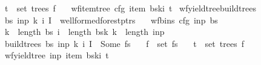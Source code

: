 \begin{isabellebody}
\ \ \ {\isachardoublequoteopen}t\ {\isasymin}\ set\ {\isacharparenleft}{\kern0pt}trees\ f{\isacharparenright}{\kern0pt}{\isachardoublequoteclose}\isanewline
\ \ \ {\isachardoublequoteopen}wf{\isacharunderscore}{\kern0pt}item{\isacharunderscore}{\kern0pt}tree\ cfg\ {\isacharparenleft}{\kern0pt}item\ {\isacharparenleft}{\kern0pt}bs{\isacharbang}{\kern0pt}k{\isacharbang}{\kern0pt}i{\isacharparenright}{\kern0pt}{\isacharparenright}{\kern0pt}\ t{\isachardoublequoteclose}%
\isadelimproof
%
\endisadelimproof
%
\isatagproof
%
\endisatagproof
{\isafoldproof}%
%
\isadelimproof
\isanewline
%
\endisadelimproof
{}\isamarkupfalse%
\ wf{\isacharunderscore}{\kern0pt}yield{\isacharunderscore}{\kern0pt}tree{\isacharunderscore}{\kern0pt}build{\isacharunderscore}{\kern0pt}trees{\isacharprime}{\kern0pt}{\isacharcolon}{\kern0pt}\isanewline
\ \ \ {\isachardoublequoteopen}{\isacharparenleft}{\kern0pt}bs{\isacharcomma}{\kern0pt}\ inp{\isacharcomma}{\kern0pt}\ k{\isacharcomma}{\kern0pt}\ i{\isacharcomma}{\kern0pt}\ I{\isacharparenright}{\kern0pt}\ {\isasymin}\ wellformed{\isacharunderscore}{\kern0pt}forest{\isacharunderscore}{\kern0pt}ptrs{\isachardoublequoteclose}\isanewline
\ \ \ {\isachardoublequoteopen}wf{\isacharunderscore}{\kern0pt}bins\ cfg\ inp\ bs{\isachardoublequoteclose}\isanewline
\ \ \ {\isachardoublequoteopen}k\ {\isacharless}{\kern0pt}\ length\ bs{\isachardoublequoteclose}\ {\isachardoublequoteopen}i\ {\isacharless}{\kern0pt}\ length\ {\isacharparenleft}{\kern0pt}bs{\isacharbang}{\kern0pt}k{\isacharparenright}{\kern0pt}{\isachardoublequoteclose}\ {\isachardoublequoteopen}k\ {\isasymle}\ length\ inp{\isachardoublequoteclose}\isanewline
\ \ \ {\isachardoublequoteopen}build{\isacharunderscore}{\kern0pt}trees{\isacharprime}{\kern0pt}\ bs\ inp\ k\ i\ I\ {\isacharequal}{\kern0pt}\ Some\ fs{\isachardoublequoteclose}\isanewline
\ \ \ {\isachardoublequoteopen}f\ {\isasymin}\ set\ fs{\isachardoublequoteclose}\isanewline
\ \ \ {\isachardoublequoteopen}t\ {\isasymin}\ set\ {\isacharparenleft}{\kern0pt}trees\ f{\isacharparenright}{\kern0pt}{\isachardoublequoteclose}\isanewline
\ \ \ {\isachardoublequoteopen}wf{\isacharunderscore}{\kern0pt}yield{\isacharunderscore}{\kern0pt}tree\ inp\ {\isacharparenleft}{\kern0pt}item\ {\isacharparenleft}{\kern0pt}bs{\isacharbang}{\kern0pt}k{\isacharbang}{\kern0pt}i{\isacharparenright}{\kern0pt}{\isacharparenright}{\kern0pt}\ t{\isachardoublequoteclose}%
\isadelimproof

\end{isabellebody}
